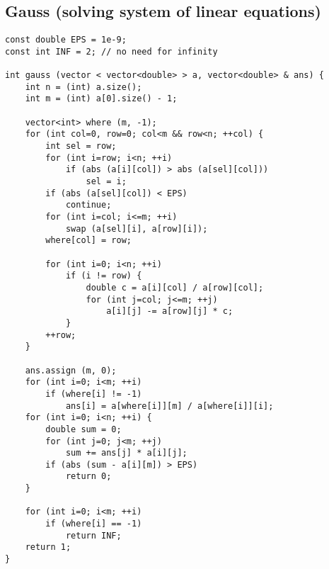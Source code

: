 \subsection{Gauss (solving system of linear equations)}
\begin{lstlisting}
const double EPS = 1e-9;
const int INF = 2; // no need for infinity

int gauss (vector < vector<double> > a, vector<double> & ans) {
    int n = (int) a.size();
    int m = (int) a[0].size() - 1;

    vector<int> where (m, -1);
    for (int col=0, row=0; col<m && row<n; ++col) {
        int sel = row;
        for (int i=row; i<n; ++i)
            if (abs (a[i][col]) > abs (a[sel][col]))
                sel = i;
        if (abs (a[sel][col]) < EPS)
            continue;
        for (int i=col; i<=m; ++i)
            swap (a[sel][i], a[row][i]);
        where[col] = row;

        for (int i=0; i<n; ++i)
            if (i != row) {
                double c = a[i][col] / a[row][col];
                for (int j=col; j<=m; ++j)
                    a[i][j] -= a[row][j] * c;
            }
        ++row;
    }

    ans.assign (m, 0);
    for (int i=0; i<m; ++i)
        if (where[i] != -1)
            ans[i] = a[where[i]][m] / a[where[i]][i];
    for (int i=0; i<n; ++i) {
        double sum = 0;
        for (int j=0; j<m; ++j)
            sum += ans[j] * a[i][j];
        if (abs (sum - a[i][m]) > EPS)
            return 0;
    }

    for (int i=0; i<m; ++i)
        if (where[i] == -1)
            return INF;
    return 1;
}
\end{lstlisting}

